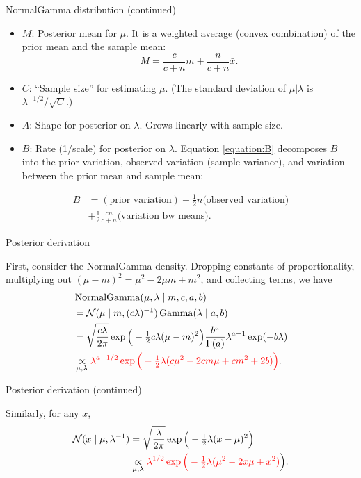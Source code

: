 \documentclass[
  ignorenonframetext,
]{beamer}
\DeclareMathOperator*{\Ga}{Gamma}
\DeclareMathOperator*{\NormalGamma}{NormalGamma}
\newcommand{\N}{\mathcal{N}}
\begin{document}
\begin{frame}{NormalGamma distribution (continued)}
\protect\hypertarget{normalgamma-distribution-continued-2}{}

\begin{itemize}
\item $M$: Posterior mean for $\mu$. It is a weighted average (convex combination) of the prior mean and the sample mean:
$$ M =\frac{c}{c + n} m + \frac{n}{c + n}\bar x. $$
\item $C$: ``Sample size'' for estimating $\mu$. (The standard deviation of $\mu|\lambda$ is $\lambda^{-1/2}/\sqrt C$.)
\item $A$: Shape for posterior on $\lambda$. Grows linearly with sample size.
\item $B$: Rate (1/scale) for posterior on $\lambda$. Equation \ref{equation:B} decomposes $B$ into the prior variation, observed variation (sample variance), and variation between the prior mean and sample mean:
\end{itemize}

\begin{align}
 B &= (\text{prior variation}) + \tfrac{1}{2}n\text{(observed variation)}\\ &+ \tfrac{1}{2}\tfrac{c n}{c + n}\text{(variation bw means)}. 
 \end{align}

\end{frame}

\begin{frame}{Posterior derivation}
\protect\hypertarget{posterior-derivation}{}

First, consider the NormalGamma density. Dropping constants of
proportionality, multiplying out \((\mu-m)^2 =\mu^2 - 2\mu m + m^2\),
and collecting terms, we have \begin{align}
&\NormalGamma(\mu,\lambda\mid m,c,a,b) \\
&= \N(\mu\mid m,(c\lambda)^{-1})\Ga(\lambda\mid a,b)\notag\\
&= \sqrt{\frac{c\lambda}{2\pi}}\exp\Big(-\tfrac{1}{2} c\lambda(\mu-m)^2\Big)
\frac{b^a}{\Gamma(a)}\lambda^{a-1}\exp(-b\lambda)\notag\\
&\underset{\mu,\lambda}{\propto} 
\textcolor{red}{\lambda^{a-1/2}\exp\Big(-\tfrac{1}{2}\lambda(c\mu^2 - 2 c m\mu + c m^2 + 2 b)\Big)}.\label{equation:NormalGamma}
\end{align}

\end{frame}

\begin{frame}{Posterior derivation (continued)}
\protect\hypertarget{posterior-derivation-continued}{}

Similarly, for any \(x\), \begin{align}
\N(x\mid\mu,\lambda^{-1}) & =\sqrt{\frac{\lambda}{2\pi}}\exp\Big(-\tfrac{1}{2}\lambda(x-\mu)^2\Big)\notag\\
&\underset{\mu,\lambda}{\propto} \textcolor{red}{\lambda^{1/2}\exp\Big(-\tfrac{1}{2}\lambda(\mu^2 - 2 x \mu + x^2)}\Big).
\label{equation:individual}
\end{align}

\end{frame}
\end{document}

